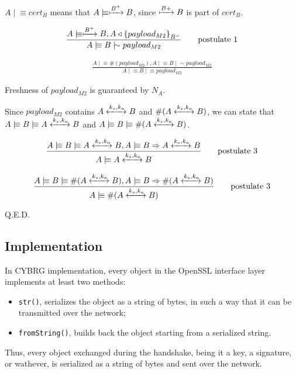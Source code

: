 \documentclass[a4paper,12pt]{article}
\newcommand{\believes}{\mid\!\equiv}
\newcommand{\sees}{\triangleleft}
\newcommand{\oncesaid}{\mid\!\sim}
\newcommand{\controls}{\Rightarrow}
\newcommand{\fresh}[1]{\#(#1)}
\newcommand{\encrypt}[2]{{ \{ #1 \} }_{#2}}
\newcommand{\sharekey}[1]{\xleftrightarrow{#1}}
\newcommand{\pubkey}[1]{\xmapsto{#1}}
\newcommand{\projectname}{CYBRG}
\begin{document}
$A \believes cert_B$ means that $A \believes \pubkey{B^+} B$, since $\pubkey{B+} B$ is part of $cert_B$.

\begin{align}
\frac{A \believes \pubkey{B^+} B, A \sees \encrypt{payload_{M2}}{B^-}}{A \believes B \oncesaid payload_{M2}} \tag*{postulate 1}
\end{align}

\begin{align}
\frac{A \believes \fresh{payload_{M2}}, A \believes B \oncesaid payload_{M2}}{A \believes B \believes payload_{M2}} \tag*{postulate 2}
\end{align}

Freshness of $payload_{M2}$ is guaranteed by $N_A$.

Since $payload_{M2}$ contains $A \sharekey{k_s, k_a} B$ and $\fresh{A \sharekey{k_s, k_a} B}$, we can state that $A \believes B \believes A \sharekey{k_s, k_a} B$ and $A \believes B \believes \fresh{A \sharekey{k_s, k_a} B}$.

\begin{align}
\frac{A \believes B \believes A \sharekey{k_s, k_a} B, A \believes B \controls A \sharekey{k_s, k_a} B}{A \believes A \sharekey{k_s, k_a} B} \tag*{postulate 3}
\end{align}

\begin{align}
\frac{A \believes B \believes \fresh{A \sharekey{k_s, k_a} B}, A \believes B \controls \fresh{A \sharekey{k_s, k_a} B}}{A \believes \fresh{A \sharekey{k_s, k_a} B}} \tag*{postulate 3}
\end{align}

Q.E.D.

\subsection{Implementation}
In \projectname{} implementation, every object in the OpenSSL interface layer implements at least two methods:
\begin{itemize}
  \item \texttt{str()}, serializes the object as a string of bytes, in such a way that it can be transmitted over the network;
  \item \texttt{fromString()}, builds back the object starting from a serialized string.
\end{itemize}

Thus, every object exchanged during the handshake, being it a key, a signature, or wathever, is serialized as a string of bytes and sent over the network.
\end{document}
